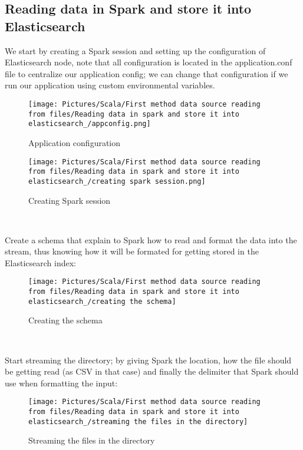 \begin{spacing}{1.2}
\section{Reading data in Spark and store it into Elasticsearch}
\par 
We start by creating a Spark session and setting up the configuration of Elasticsearch node, note that all configuration is located in the application.conf file to centralize our application config; we can change that configuration if we run our application using custom environmental variables.
\\
\begin{figure}[!htb] 
\begin{center} 
\texttt{[image: Pictures/Scala/First method data source reading from files/Reading data in spark and store it into elasticsearch\_/appconfig.png]} 
\end{center} 
\caption{Application configuration} 
\end{figure}  \FloatBarrier
\vspace{1cm}
\begin{figure}[!htb] 
\begin{center} 
\texttt{[image: Pictures/Scala/First method data source reading from files/Reading data in spark and store it into elasticsearch\_/creating spark session.png]} 
\end{center} 
\caption{Creating Spark session} 
\end{figure}  \FloatBarrier
\\

\par 
Create a schema that explain to Spark how to read and format the data into the stream, thus knowing how it will be formated for getting stored in the Elasticsearch index:
\\
\begin{figure}[!htb] 
\begin{center} 
\texttt{[image: Pictures/Scala/First method data source reading from files/Reading data in spark and store it into elasticsearch\_/creating the schema]} 
\end{center} 
\caption{Creating the schema} 
\end{figure}  \FloatBarrier
\\

\par Start streaming the directory; by giving Spark the location, how the file should be getting read (as CSV in that case) and finally the delimiter that Spark should use when formatting the input:
\\
\begin{figure}[!htb] 
\begin{center} 
\texttt{[image: Pictures/Scala/First method data source reading from files/Reading data in spark and store it into elasticsearch\_/streaming the files in the directory]} 
\end{center} 
\caption{Streaming the files in the directory} 
\end{figure}  \FloatBarrier
\\


\end{spacing}
